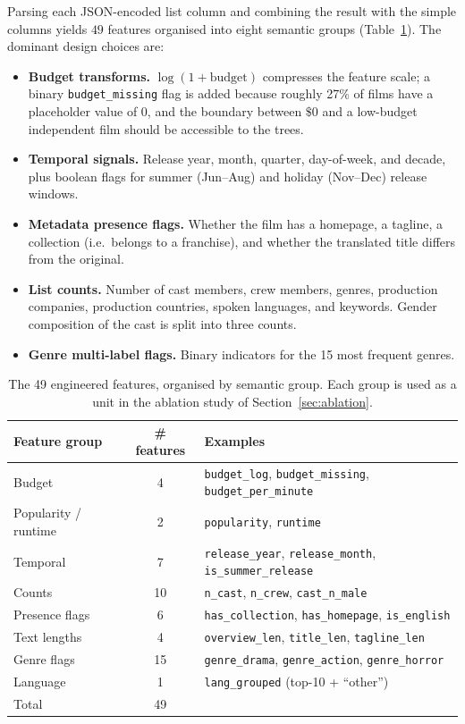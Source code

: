 \documentclass[10pt,a4paper]{article}
\begin{document}
Parsing each JSON-encoded list column and combining the result with the simple
columns yields \(49\) features organised into eight semantic groups
(Table~\ref{tab:feature_groups}). The dominant design choices are:
\begin{itemize}
    \item \textbf{Budget transforms.} \(\log(1{+}\text{budget})\) compresses the
        feature scale; a binary \texttt{budget\_missing} flag is added because
        roughly 27\% of films have a placeholder value of \(0\), and the
        boundary between $\$0$ and a low-budget independent film should be
        accessible to the trees.
    \item \textbf{Temporal signals.} Release year, month, quarter, day-of-week,
        and decade, plus boolean flags for summer (Jun–Aug) and holiday (Nov–Dec)
        release windows.
    \item \textbf{Metadata presence flags.} Whether the film has a homepage, a
        tagline, a collection (i.e.\ belongs to a franchise), and whether the
        translated title differs from the original.
    \item \textbf{List counts.} Number of cast members, crew members, genres,
        production companies, production countries, spoken languages, and
        keywords. Gender composition of the cast is split into three counts.
    \item \textbf{Genre multi-label flags.} Binary indicators for the 15 most
        frequent genres.
\end{itemize}

\begin{table}[H]
\centering
\small
\begin{tabular}{lcl}
\toprule
Feature group & \# features & Examples \\
\midrule
Budget         & 4  & \texttt{budget\_log}, \texttt{budget\_missing}, \texttt{budget\_per\_minute} \\
Popularity / runtime  & 2  & \texttt{popularity}, \texttt{runtime} \\
Temporal       & 7  & \texttt{release\_year}, \texttt{release\_month}, \texttt{is\_summer\_release} \\
Counts         & 10 & \texttt{n\_cast}, \texttt{n\_crew}, \texttt{cast\_n\_male} \\
Presence flags & 6  & \texttt{has\_collection}, \texttt{has\_homepage}, \texttt{is\_english} \\
Text lengths   & 4  & \texttt{overview\_len}, \texttt{title\_len}, \texttt{tagline\_len} \\
Genre flags    & 15 & \texttt{genre\_drama}, \texttt{genre\_action}, \texttt{genre\_horror} \\
Language       & 1  & \texttt{lang\_grouped} (top-10 + ``other'') \\
\midrule
Total          & 49 & \\
\bottomrule
\end{tabular}
\caption{The 49 engineered features, organised by semantic group. Each group is
used as a unit in the ablation study of Section~\ref{sec:ablation}.}
\label{tab:feature_groups}
\end{table}
\end{document}
